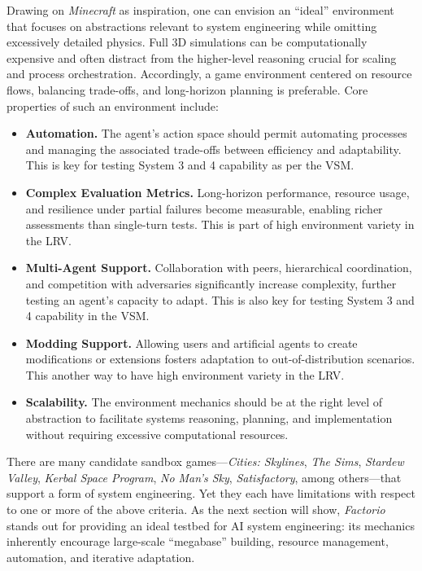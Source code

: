 Drawing on \textit{Minecraft} as inspiration, one can envision an “ideal” environment that focuses on abstractions relevant to system engineering while omitting excessively detailed physics. Full 3D simulations can be computationally expensive and often distract from the higher-level reasoning crucial for scaling and process orchestration. Accordingly, a game environment centered on resource flows, balancing trade-offs, and long-horizon planning is preferable. Core properties of such an environment include:
\begin{itemize}
    \item \textbf{Automation.} The agent’s action space should permit automating processes and managing the associated trade-offs between efficiency and adaptability. This is key for testing System 3 and 4 capability as per the VSM.
    \item \textbf{Complex Evaluation Metrics.} Long-horizon performance, resource usage, and resilience under partial failures become measurable, enabling richer assessments than single-turn tests. This is part of high environment variety in the LRV.
    \item \textbf{Multi-Agent Support.} Collaboration with peers, hierarchical coordination, and competition with adversaries significantly increase complexity, further testing an agent’s capacity to adapt. This is also key for testing System 3 and 4 capability in the VSM. 
    \item \textbf{Modding Support.} Allowing users and artificial agents to create modifications or extensions fosters adaptation to out-of-distribution scenarios. This another way to have high environment variety in the LRV.
    \item \textbf{Scalability.} The environment mechanics should be at the right level of abstraction to facilitate systems reasoning, planning, and implementation without requiring excessive computational resources.
\end{itemize}

There are many candidate sandbox games—\textit{Cities: Skylines}, \textit{The Sims}, \textit{Stardew Valley}, \textit{Kerbal Space Program}, \textit{No Man's Sky}, \textit{Satisfactory}, among others—that support a form of system engineering. Yet they each have limitations with respect to one or more of the above criteria. As the next section will show, \emph{Factorio} stands out for providing an ideal testbed for AI system engineering: its mechanics inherently encourage large-scale “megabase” building, resource management, automation, and iterative adaptation.